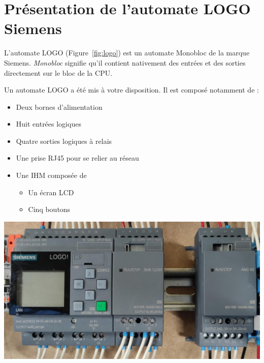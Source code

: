 \section{Présentation de l'automate \textbf{LOGO} Siemens}



L'automate LOGO (Figure~\ref{fig:logo}) est un automate Monobloc de la marque Siemens. 
\textit{Monobloc} signifie qu'il contient nativement des entrées et des sorties directement sur le bloc de la CPU. 



\begin{UPSTIactivite}
    Un automate LOGO a été mis à votre disposition. Il est composé notamment de : 
    \begin{itemize}
        \item Deux bornes d'alimentation
        \item Huit entrées logiques
        \item Quatre sorties logiques à relais
        \item Une prise RJ45 pour se relier au réseau
        \item Une IHM composée de
        \begin{itemize}
            \item Un écran LCD
            \item Cinq boutons 
        \end{itemize}
    \end{itemize}


    \begin{center}
        \includegraphics[width=.6\textwidth, height=.35\textheight,keepaspectratio]{images/maquette_logo.jpg}
    \end{center}

\end{UPSTIactivite}


